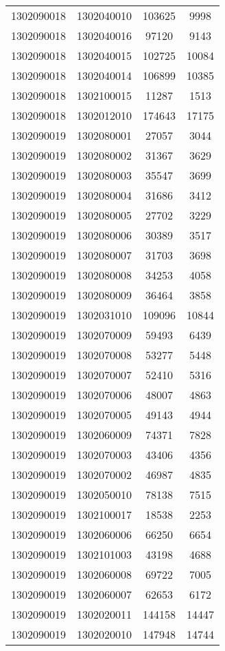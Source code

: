 \begin{longtable}{llcc}
1302090018 & 1302040010 & 103625 & 9998\\
1302090018 & 1302040016 & 97120 & 9143\\
1302090018 & 1302040015 & 102725 & 10084\\
1302090018 & 1302040014 & 106899 & 10385\\
1302090018 & 1302100015 & 11287 & 1513\\
1302090018 & 1302012010 & 174643 & 17175\\
1302090019 & 1302080001 & 27057 & 3044\\
1302090019 & 1302080002 & 31367 & 3629\\
1302090019 & 1302080003 & 35547 & 3699\\
1302090019 & 1302080004 & 31686 & 3412\\
1302090019 & 1302080005 & 27702 & 3229\\
1302090019 & 1302080006 & 30389 & 3517\\
1302090019 & 1302080007 & 31703 & 3698\\
1302090019 & 1302080008 & 34253 & 4058\\
1302090019 & 1302080009 & 36464 & 3858\\
1302090019 & 1302031010 & 109096 & 10844\\
1302090019 & 1302070009 & 59493 & 6439\\
1302090019 & 1302070008 & 53277 & 5448\\
1302090019 & 1302070007 & 52410 & 5316\\
1302090019 & 1302070006 & 48007 & 4863\\
1302090019 & 1302070005 & 49143 & 4944\\
1302090019 & 1302060009 & 74371 & 7828\\
1302090019 & 1302070003 & 43406 & 4356\\
1302090019 & 1302070002 & 46987 & 4835\\
1302090019 & 1302050010 & 78138 & 7515\\
1302090019 & 1302100017 & 18538 & 2253\\
1302090019 & 1302060006 & 66250 & 6654\\
1302090019 & 1302101003 & 43198 & 4688\\
1302090019 & 1302060008 & 69722 & 7005\\
1302090019 & 1302060007 & 62653 & 6172\\
1302090019 & 1302020011 & 144158 & 14447\\
1302090019 & 1302020010 & 147948 & 14744\\

\end{longtable}
